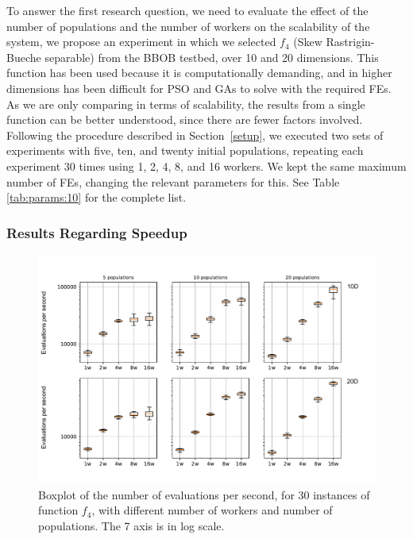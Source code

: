 \documentclass[review]{elsarticle}
\begin{document}
To answer the first research question, we need to evaluate the effect of the
number of populations and the number of workers on the scalability of the
system, we propose an experiment in which we selected $f_4$ (Skew
Rastrigin-Bueche separable) from the BBOB testbed, over 10 and 20 dimensions. This function has been used
because it is computationally demanding, and in higher dimensions has been
difficult for PSO \cite{el2009black} and GAs \cite{nicolau2009application} to
solve with the required FEs. As we are only comparing in terms of scalability,
the results from a single function can be better understood, since there are
fewer factors involved. Following the procedure described in
Section~\ref{setup}, we executed two sets of experiments with five, ten, and twenty
initial populations, repeating each experiment 30 times using 1, 2, 4, 8, and 16
workers. We kept the same maximum number of FEs, changing the relevant
parameters for this. See Table \ref{tab:params:10} for the complete list.

\subsubsection{Results Regarding Speedup}
\label{sec:speedup}

\begin{figure}[h!tbp]
  \centering
  \includegraphics[width=\textwidth]{eval_ratio}
  \caption{Boxplot of the number of evaluations per second, for 30 instances of function $f_4$,
          with different number of workers and number of populations. The 7 axis is in log scale.}
  \label{fig:spworker:evalspersecond}
\end{figure}
\end{document}
